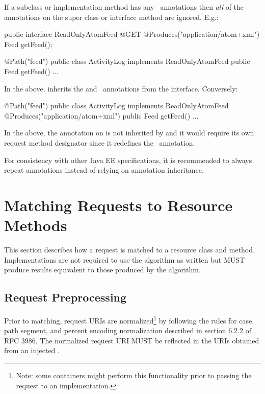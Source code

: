 If a subclass or implementation method has any \jaxrs\ annotations then {\em all} of the annotations on the super class or interface method are ignored. E.g.:

\begin{listing}{1}
public interface ReadOnlyAtomFeed {
  @GET @Produces("application/atom+xml")
  Feed getFeed();
}

@Path("feed")
public class ActivityLog implements ReadOnlyAtomFeed {
  public Feed getFeed() {...}
}
\end{listing}

In the above,  inherits the  and \Produces\ annotations from the interface. Conversely:

\begin{listing}{1}
@Path("feed")
public class ActivityLog implements ReadOnlyAtomFeed {
  @Produces("application/atom+xml")
  public Feed getFeed() {...}
}
\end{listing}

In the above, the  annotation on  is not inherited by  and it would require its own request method designator since it redefines the \Produces\ annotation.

For consistency with other Java EE specifications, it is recommended to always repeat annotations instead of relying on annotation inheritance. 

\section{Matching Requests to Resource Methods}
\label{mapping_requests_to_java_methods}

This section describes how a request is matched to a resource class and method. Implementations are not required to use the algorithm as written but MUST produce results equivalent to those produced by the algorithm.

\subsection{Request Preprocessing}
\label{reqpreproc}

Prior to matching, request URIs are normalized\footnote{Note: some containers might perform this functionality prior to passing the request to an implementation.} by following the rules for case, path segment, and percent encoding normalization described in section 6.2.2 of RFC 3986\cite{uri}. The normalized request URI MUST be reflected in the URIs obtained from an injected .

